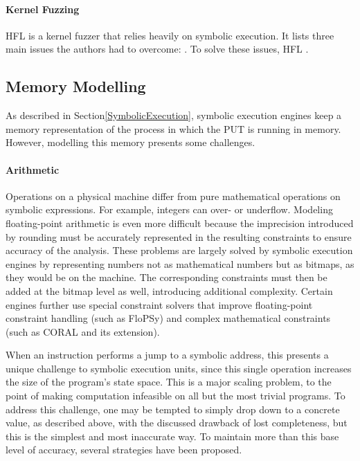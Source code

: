 \documentclass{article}
\begin{document}
\begin{multicols}{2}
    \paragraph{Kernel Fuzzing}
    HFL\cite{HFL} is a kernel fuzzer that relies heavily on symbolic execution. It lists three main issues the authors had to overcome: \cite{HFL}. To solve these issues, HFL \cite{HFL}.

    \subsection{Memory Modelling}
    As described in Section\ref{SymbolicExecution}, symbolic execution engines keep a memory representation of the process in which the PUT is running in memory. However, modelling this memory presents some challenges.

    \paragraph{Arithmetic}
    Operations on a physical machine differ from pure mathematical operations on symbolic expressions. For example, integers can over- or underflow. Modeling floating-point arithmetic is even more difficult because the imprecision introduced by rounding must be accurately represented in the resulting constraints to ensure accuracy of the analysis. These problems are largely solved by symbolic execution engines by representing numbers not as mathematical numbers but as bitmaps, as they would be on the machine. The corresponding constraints must then be added at the bitmap level as well, introducing additional complexity. Certain engines further use special constraint solvers that improve floating-point constraint handling (such as FloPSy\cite{FloPSy}) and complex mathematical constraints (such as CORAL\cite{CORAL} and its extension\cite{CORALAVM}).

    When an instruction performs a jump to a symbolic address, this presents a unique challenge to symbolic execution units, since this single operation increases the size of the program's state space. This is a major scaling problem, to the point of making computation infeasible on all but the most trivial programs. To address this challenge, one may be tempted to simply drop down to a concrete value, as described above, with the discussed drawback of lost completeness, but this is the simplest and most inaccurate way. To maintain more than this base level of accuracy, several strategies have been proposed.


\end{multicols}
\end{document}
